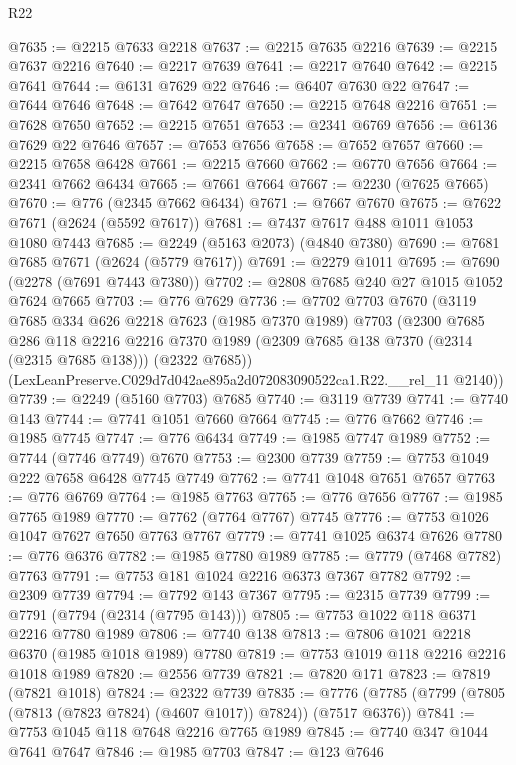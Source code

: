 \begin{lexlean}{R22}
\begin{coremodule}
@7635 := @2215 @7633 @2218
@7637 := @2215 @7635 @2216
@7639 := @2215 @7637 @2216
@7640 := @2217 @7639
@7641 := @2217 @7640
@7642 := @2215 @7641
@7644 := @6131 @7629 @22
@7646 := @6407 @7630 @22
@7647 := @7644 @7646
@7648 := @7642 @7647
@7650 := @2215 @7648 @2216
@7651 := @7628 @7650
@7652 := @2215 @7651
@7653 := @2341 @6769
@7656 := @6136 @7629 @22 @7646
@7657 := @7653 @7656
@7658 := @7652 @7657
@7660 := @2215 @7658 @6428
@7661 := @2215 @7660
@7662 := @6770 @7656
@7664 := @2341 @7662 @6434
@7665 := @7661 @7664
@7667 := @2230 (@7625 @7665)
@7670 := @776 (@2345 @7662 @6434)
@7671 := @7667 @7670
@7675 := @7622 @7671 (@2624 (@5592 @7617))
@7681 := @7437 @7617 @488 @1011 @1053 @1080 @7443
@7685 := @2249 (@5163 @2073) (@4840 @7380)
@7690 := @7681 @7685 @7671 (@2624 (@5779 @7617))
@7691 := @2279 @1011
@7695 := @7690 (@2278 (@7691 @7443 @7380))
@7702 := @2808 @7685 @240 @27 @1015 @1052 @7624 @7665
@7703 := @776 @7629
@7736 := @7702
    @7703
    @7670
    (@3119
      @7685
      @334
      @626
      @2218
      @7623
      (@1985 @7370 @1989)
      @7703
      (@2300
        @7685
        @286
        @118
        @2216
        @2216
        @7370
        @1989
        (@2309 @7685 @138 @7370 (@2314 (@2315 @7685 @138)))
        (@2322 @7685))
      (LexLeanPreserve.C029d7d042ae895a2d072083090522ca1.R22.__rel_11 @2140))
@7739 := @2249 (@5160 @7703) @7685
@7740 := @3119 @7739
@7741 := @7740 @143
@7744 := @7741 @1051 @7660 @7664
@7745 := @776 @7662
@7746 := @1985 @7745
@7747 := @776 @6434
@7749 := @1985 @7747 @1989
@7752 := @7744 (@7746 @7749) @7670
@7753 := @2300 @7739
@7759 := @7753 @1049 @222 @7658 @6428 @7745 @7749
@7762 := @7741 @1048 @7651 @7657
@7763 := @776 @6769
@7764 := @1985 @7763
@7765 := @776 @7656
@7767 := @1985 @7765 @1989
@7770 := @7762 (@7764 @7767) @7745
@7776 := @7753 @1026 @1047 @7627 @7650 @7763 @7767
@7779 := @7741 @1025 @6374 @7626
@7780 := @776 @6376
@7782 := @1985 @7780 @1989
@7785 := @7779 (@7468 @7782) @7763
@7791 := @7753 @181 @1024 @2216 @6373 @7367 @7782
@7792 := @2309 @7739
@7794 := @7792 @143 @7367
@7795 := @2315 @7739
@7799 := @7791 (@7794 (@2314 (@7795 @143)))
@7805 := @7753 @1022 @118 @6371 @2216 @7780 @1989
@7806 := @7740 @138
@7813 := @7806 @1021 @2218 @6370 (@1985 @1018 @1989) @7780
@7819 := @7753 @1019 @118 @2216 @2216 @1018 @1989
@7820 := @2556 @7739
@7821 := @7820 @171
@7823 := @7819 (@7821 @1018)
@7824 := @2322 @7739
@7835 := @7776 (@7785 (@7799 (@7805 (@7813 (@7823 @7824) (@4607 @1017)) @7824)) (@7517 @6376))
@7841 := @7753 @1045 @118 @7648 @2216 @7765 @1989
@7845 := @7740 @347 @1044 @7641 @7647
@7846 := @1985 @7703
@7847 := @123 @7646

\end{coremodule}
\end{lexlean}
